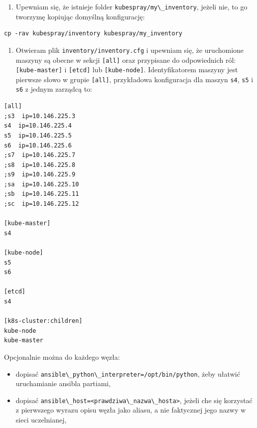 \documentclass[a4paper,12pt,twoside,openany]{report}
\providecommand{\tightlist}{%
  \setlength{\itemsep}{0pt}\setlength{\parskip}{0pt}}
\newcommand{\passthrough}[1]{#1}
\begin{document}
\begin{enumerate}
\def\labelenumi{\arabic{enumi}.}
\setcounter{enumi}{4}
\tightlist
\item
  Upewniam się, że istnieje folder
  \passthrough{\lstinline!kubespray/my\_inventory!}, jeżeli nie, to go
  tworzymę kopiując domyślną konfigurację:
\end{enumerate}

\begin{lstlisting}
cp -rav kubespray/inventory kubespray/my_inventory
\end{lstlisting}

\begin{enumerate}
\def\labelenumi{\arabic{enumi}.}
\setcounter{enumi}{5}
\tightlist
\item
  Otwieram plik \passthrough{\lstinline!inventory/inventory.cfg!} i
  upewniam się, że uruchomione maszyny są obecne w sekcji
  \passthrough{\lstinline![all]!} oraz przypisane do odpowiednich ról:
  \passthrough{\lstinline![kube-master]!} i
  \passthrough{\lstinline![etcd]!} lub
  \passthrough{\lstinline![kube-node]!}. Identyfikatorem maszyny jest
  pierwsze słowo w grupie \passthrough{\lstinline![all]!}, przykładowa
  konfiguracja dla maszyn \passthrough{\lstinline!s4!},
  \passthrough{\lstinline!s5!} i \passthrough{\lstinline!s6!} z jednym
  zarządcą to:
\end{enumerate}

\begin{lstlisting}
[all]
;s3  ip=10.146.225.3
s4  ip=10.146.225.4
s5  ip=10.146.225.5
s6  ip=10.146.225.6
;s7  ip=10.146.225.7
;s8  ip=10.146.225.8
;s9  ip=10.146.225.9
;sa  ip=10.146.225.10
;sb  ip=10.146.225.11
;sc  ip=10.146.225.12

[kube-master]
s4

[kube-node]
s5
s6

[etcd]
s4

[k8s-cluster:children]
kube-node
kube-master
\end{lstlisting}

Opcjonalnie można do każdego węzła:

\begin{itemize}
\tightlist
\item
  dopisać
  \passthrough{\lstinline!ansible\_python\_interpreter=/opt/bin/python!},
  żeby ułatwić uruchamianie ansibla partiami,
\item
  dopisać
  \passthrough{\lstinline!ansible\_host=<prawdziwa\_nazwa\_hosta>!},
  jeżeli che się korzystać z pierwszego wyrazu opisu węzła jako aliasu,
  a nie faktycznej jego nazwy w sieci uczelnianej,
\end{itemize}
\end{document}
